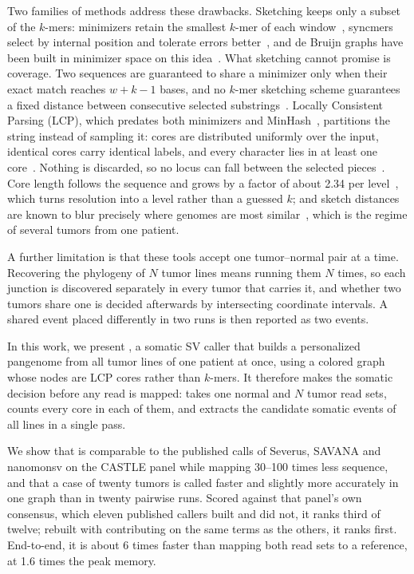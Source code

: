 Two families of methods address these drawbacks. Sketching keeps only a subset of the $k$-mers: minimizers retain the smallest $k$-mer of each window~\cite{roberts}, syncmers select by internal position and tolerate errors better~\cite{syncmers}, and de Bruijn graphs have been built in minimizer space on this idea~\cite{rustmdbg}. What sketching cannot promise is coverage. Two sequences are guaranteed to share a minimizer only when their exact match reaches $w+k-1$ bases, and no $k$-mer sketching scheme guarantees a fixed distance between consecutive selected substrings~\cite{lcpan}. Locally Consistent Parsing (LCP), which predates both minimizers and MinHash~\cite{sv94a,sv94b}, partitions the string instead of sampling it: cores are distributed uniformly over the input, identical cores carry identical labels, and every character lies in at least one core~\cite{lcpan}. Nothing is discarded, so no locus can fall between the selected pieces~\cite{gencore}. Core length follows the sequence and grows by a factor of about 2.34 per level~\cite{lcpan}, which turns resolution into a level rather than a guessed $k$; and sketch distances are known to blur precisely where genomes are most similar~\cite{gencore}, which is the regime of several tumors from one patient.

A further limitation is that these tools accept one tumor--normal pair at a time. Recovering the phylogeny of $N$ tumor lines means running them $N$ times, so each junction is discovered separately in every tumor that carries it, and whether two tumors share one is decided afterwards by intersecting coordinate intervals. A shared event placed differently in two runs is then reported as two events.

In this work, we present \tool{}, a somatic SV caller that builds a personalized pangenome from all tumor lines of one patient at once, using a colored graph whose nodes are LCP cores rather than $k$-mers. It therefore makes the somatic decision before any read is mapped: \tool{} takes one normal and $N$ tumor read sets, counts every core in each of them, and extracts the candidate somatic events of all lines in a single pass.

We show that \tool{} is comparable to the published calls of Severus, SAVANA and nanomonsv on the CASTLE panel while mapping 30--100 times less sequence, and that a case of twenty tumors is called faster and slightly more accurately in one graph than in twenty pairwise runs. Scored against that panel's own consensus, which eleven published callers built and \tool{} did not, it ranks third of twelve; rebuilt with \tool{} contributing on the same terms as the others, it ranks first. End-to-end, it is about 6 times faster than mapping both read sets to a reference, at 1.6 times the peak memory.

